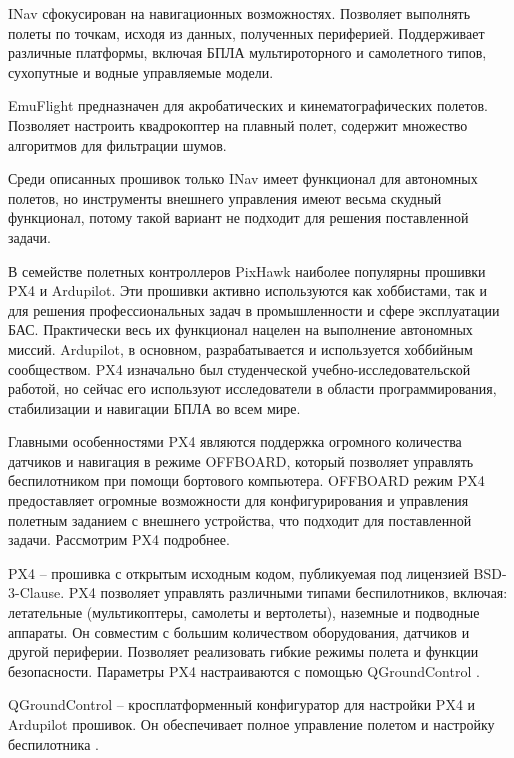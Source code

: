 INav сфокусирован на навигационных возможностях. Позволяет выполнять полеты по точкам, исходя из данных, полученных периферией. Поддерживает различные платформы, включая БПЛА мультироторного и самолетного типов, сухопутные и водные управляемые модели.

EmuFlight предназначен для акробатических и кинематографических полетов. Позволяет настроить квадрокоптер на плавный полет, содержит множество алгоритмов для фильтрации шумов.

Среди описанных прошивок только INav имеет функционал для автономных полетов, но инструменты внешнего управления имеют весьма скудный функционал, потому такой вариант не подходит для решения поставленной задачи.

В семействе полетных контроллеров PixHawk наиболее популярны прошивки PX4 и Ardupilot. Эти прошивки активно используются как хоббистами, так и для решения профессиональных задач в промышленности и сфере эксплуатации БАС. Практически весь их функционал нацелен на выполнение автономных миссий. Ardupilot, в основном, разрабатывается и используется хоббийным сообществом. PX4 изначально был студенческой учебно-исследовательской работой, но сейчас его используют исследователи в области программирования, стабилизации и навигации БПЛА во всем мире.

Главными особенностями PX4 являются поддержка огромного количества датчиков и навигация в режиме OFFBOARD, который позволяет управлять беспилотником при помощи бортового компьютера. OFFBOARD режим PX4 предоставляет огромные возможности для конфигурирования и управления полетным заданием с внешнего устройства, что подходит для поставленной задачи. Рассмотрим PX4 подробнее.


PX4 -- прошивка с открытым исходным кодом, публикуемая под лицензией BSD-3-Clause. PX4 позволяет управлять различными типами беспилотников, включая: летательные (мультикоптеры, самолеты и вертолеты), наземные и подводные аппараты. Он совместим с большим количеством оборудования, датчиков и другой периферии. Позволяет реализовать гибкие режимы полета и функции безопасности.
Параметры PX4 настраиваются с помощью Q\-Ground\-Control \cite{px4}.

QGroundControl -- кросплатформенный конфигуратор для настройки PX4 и Ardupilot прошивок. Он обеспечивает полное управление полетом и настройку беспилотника \cite{qgroundcontrol}.

